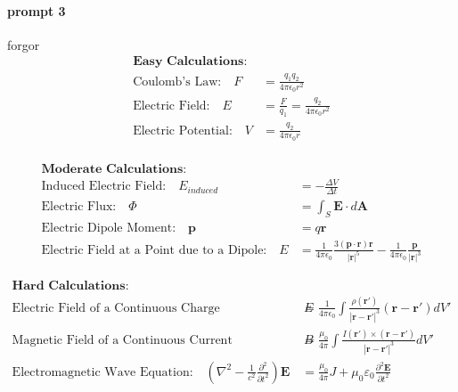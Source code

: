 \documentclass{article}
\begin{document}
\paragraph{prompt 3} forgor%
\label{par:prompt 3paragraph name}
\begin{align} 
\textbf{Easy Calculations:}\\ 
\text{Coulomb's Law:} \quad  F &= \frac{q_1q_2}{4\pi\epsilon_0r^2} \\ 
\text{Electric Field:} \quad E &= \frac{F}{q_1} = \frac{q_2}{4\pi\epsilon_0r^2}\\ 
\text{Electric Potential:} \quad V &= \frac{q_2}{4\pi\epsilon_0r} \\ 
\end{align}

\begin{align} 
\textbf{Moderate Calculations:} \\
\text{Induced Electric Field:} \quad E_{induced} &= -\frac{\Delta V}{\Delta t} \\ 
\text{Electric Flux:} \quad \Phi &= \int_S \mathbf{E} \cdot d\mathbf{A} \\ 
\text{Electric Dipole Moment:} \quad \mathbf{p} &= q\mathbf{r} \\ 
\text{Electric Field at a Point due to a Dipole:} \quad E &= \frac{1}{4\pi\epsilon_0}\frac{3(\mathbf{p}\cdot\mathbf{r})\mathbf{r}}{|\mathbf{r}|^5} - \frac{1}{4\pi\epsilon_0}\frac{\mathbf{p}}{|\mathbf{r}|^3}
\end{align}

\begin{align}
\textbf{Hard Calculations:} \\
\text{Electric Field of a Continuous Charge Distribution:} \quad E &= \frac{1}{4\pi\epsilon_0}\int \frac{\rho(\mathbf{r'})}{|\mathbf{r}-\mathbf{r'}|^3}(\mathbf{r}-\mathbf{r'})dV' \\ 
\text{Magnetic Field of a Continuous Current Distribution:} \quad B &= \frac{\mu_0}{4\pi}\int \frac{I(\mathbf{r'})\times(\mathbf{r}-\mathbf{r'})}{|\mathbf{r}-\mathbf{r'}|^3}dV' \\
\text{Electromagnetic Wave Equation:} \quad \left(\nabla^2 - \frac{1}{c^2}\frac{\partial^2}{\partial t^2}\right)\mathbf{E} &= \frac{\mu_0}{4\pi}J + \mu_0\varepsilon_0\frac{\partial^2 \mathbf{E}}{\partial t^2}
\end{align}
\end{document}
